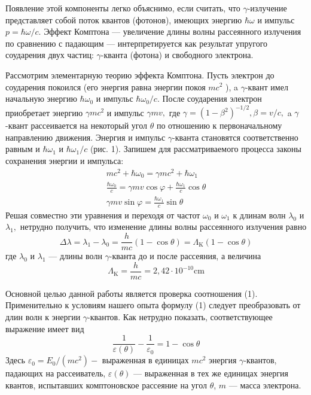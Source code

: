 \documentclass[a4paper, 12pt]{article}
\begin{document}
Появление этой компоненты легко объяснимо, если считать, что $\gamma$-излучение представляет собой поток квантов (фотонов), имеющих энергию $\hbar \omega$ и импульс $p=\hbar \omega / c .$ Эффект Комптона --- увеличение длины волны рассеянного излучения по сравнению с падающим --- интерпретируется как результат упругого соударения двух частиц: $\gamma$-кванта (фотона) и свободного электрона.

Рассмотрим элементарную теорию эффекта Комптона. Пусть электрон до соударения покоился (его энергия равна энергии покоя $m c^{2}$ ), a $\gamma$-квант имел начальную энергию $\hbar \omega_{0}$ и импульс $\hbar \omega_{0} / c .$ После соударения электрон приобретает энергию $\gamma m c^{2}$ и импульс $\gamma m v,$ где $\gamma = \left(1-\beta^{2}\right)^{-1 / 2}, \beta=v / c,$ a $\gamma$-квант рассеивается на некоторый угол $\theta$ по отношению к первоначальному направлению движения. Энергия и импульс $\gamma$-кванта становятся соответственно равным и $\hbar \omega_{1}$ и $\hbar \omega_{1} / c$ (рис. 1). Запишем для рассматриваемого процесса законы сохранения энергии и импульса:
$$
\begin{array}{c}
m c^{2}+\hbar \omega_{0}=\gamma m c^{2}+\hbar \omega_{1} \\
\frac{\hbar \omega_{0}}{c}=\gamma m v \cos \varphi+\frac{\hbar \omega_{1}}{c} \cos \theta \\
\gamma m v \sin \varphi=\frac{\hbar \omega_{1}}{c} \sin \theta
\end{array}
$$
Решая совместно эти уравнения и переходя от частот $\omega_{0}$ и $\omega_{1}$ к длинам волн $\lambda_{0}$ и $\lambda_{1},$ нетрудно получить, что изменение длины волны рассеянного излучения равно
\begin{equation}
\Delta \lambda=\lambda_{1}-\lambda_{0}=\frac{h}{m c}(1-\cos \theta)=\Lambda_{\mathrm{K}}(1-\cos \theta)
\end{equation}
где $\lambda_{0}$ и $\lambda_{1}$ --- длины волн $\gamma$-кванта до и после рассеяния, а величина
$$
\Lambda_{\mathrm{K}}=\frac{h}{m c}=2,42 \cdot 10^{-10} \mathrm{cm}
$$

Основной целью данной работы является проверка соотношения
(1). Применительно к условиям нашего опыта формулу
(1) следует преобразовать от длин волн к энергии $\gamma$-квантов. Как нетрудно показать, соответствующее выражение имеет вид
\begin{equation}
\frac{1}{\varepsilon(\theta)}-\frac{1}{\varepsilon_{0}}=1-\cos \theta
\end{equation}
Здесь $\varepsilon_{0}=E_{0} /\left(m c^{2}\right)-$ выраженная в единицах $m c^{2}$ энергия $\gamma$-квантов, падающих на рассеиватель, $\varepsilon(\theta)$ --- выраженная в тех же единицах энергия квантов, испытавших комптоновское рассеяние на угол $\theta$, $m$ --- масса электрона.
\end{document}
